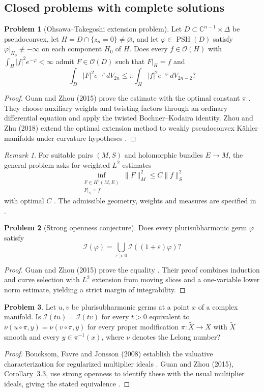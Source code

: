 \documentclass[11pt,reqno]{amsart}
\DeclareMathOperator{\PSH}{PSH}
\theoremstyle{definition}
\newtheorem{problem}{Problem}[section]
\theoremstyle{remark}
\newtheorem*{remark}{Remark}
\begin{document}
\subsection{Closed problems with complete solutions}

\begin{problem}[Ohsawa--Takegoshi extension problem]\label{Z-extension}
Let $D\subset\mathbb C^{n-1}\times\Delta$ be pseudoconvex, let $H=D\cap\{z_n=0\}\ne\varnothing$, and let $\varphi\in\PSH(D)$ satisfy $\varphi|_{H_0}\not\equiv-\infty$ on each component $H_0$ of $H$. Does every $f\in\mathcal O(H)$ with $\int_H|f|^2e^{-\varphi}<\infty$ admit $F\in\mathcal O(D)$ such that $F|_H=f$ and
\[
 \int_D|F|^2e^{-\varphi}\,dV_{2n}
 \leq\pi\int_H|f|^2e^{-\varphi}\,dV_{2n-2}?
\]
\end{problem}
\begin{proof}
Guan and Zhou (2015) prove the estimate with the optimal constant $\pi$ \cite{Z-GZextension}. They choose auxiliary weights and twisting factors through an ordinary differential equation and apply the twisted Bochner--Kodaira identity. Zhou and Zhu (2018) extend the optimal extension method to weakly pseudoconvex K\"ahler manifolds under curvature hypotheses \cite{Z-ZZ2018}.
\end{proof}
\begin{remark}
For suitable pairs $(M,S)$ and holomorphic bundles $E\to M$, the general problem asks for weighted $L^2$ estimates
\[
 \inf_{\substack{F\in H^0(M,E)\\F|_S=f}}\|F\|_M^2
 \leq C\|f\|_S^2
\]
with optimal $C$ \cite[\S5.2]{Zhou2019}. The admissible geometry, weights and measures are specified in \cite{Z-GZextension,Z-ZZ2018}.
\end{remark}

\begin{problem}[Strong openness conjecture]\label{Z-openness}
Does every plurisubharmonic germ $\varphi$ satisfy
\[
 \mathcal I(\varphi)=\bigcup_{\varepsilon>0}\mathcal I((1+\varepsilon)\varphi)?
\]
\end{problem}
\begin{proof}
Guan and Zhou (2015) prove the equality \cite{Z-GZopen}. Their proof combines induction and curve selection with $L^2$ extension from moving slices and a one-variable lower norm estimate, yielding a strict margin of integrability.
\end{proof}

\begin{problem}\label{Z-BFJ}
Let $u,v$ be plurisubharmonic germs at a point $x$ of a complex manifold. Is $\mathcal I(tu)=\mathcal I(tv)$ for every $t>0$ equivalent to
$\nu(u\circ\pi,y)=\nu(v\circ\pi,y)$ for every proper modification $\pi:\widetilde X\to X$ with $\widetilde X$ smooth and every $y\in\pi^{-1}(x)$, where $\nu$ denotes the Lelong number?
\end{problem}
\begin{proof}
Boucksom, Favre and Jonsson (2008) establish the valuative characterization for regularized multiplier ideals \cite{Z-BFJ2008}. Guan and Zhou (2015), Corollary~3.3, use strong openness to identify these with the usual multiplier ideals, giving the stated equivalence \cite{Z-GZopen}.
\end{proof}
\end{document}
